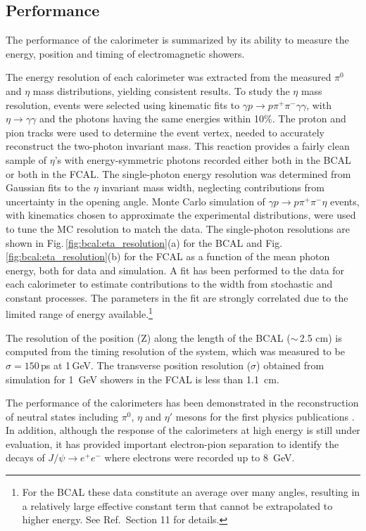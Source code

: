 \subsection{Performance \label{sec:calperformance}}
The performance of the calorimeter is summarized by its ability to measure the energy, position and timing of electromagnetic showers.

The energy resolution of each calorimeter was extracted from the measured $\pi^0$ and $\eta$ mass distributions, yielding consistent results. 
To study the $\eta$ mass resolution, events were selected using kinematic fits to $\gamma p \rightarrow p \pi^+ \pi^- \gamma \gamma$, with $\eta\rightarrow \gamma\gamma$ and the photons having the same energies within 10\%.
The proton and pion tracks were used to determine the event vertex, needed to accurately reconstruct the two-photon invariant mass.
This reaction provides a fairly clean sample of $\eta$'s with energy-symmetric photons recorded either both in the BCAL or both in the FCAL. 
The single-photon energy resolution was determined from Gaussian fits to the $\eta$ invariant mass width, neglecting contributions from uncertainty in the opening angle.
Monte Carlo simulation of $\gamma p \rightarrow p \pi^+ \pi^- \eta$ events, with kinematics chosen to approximate the experimental distributions, were used to tune the MC resolution to match the data. 
The single-photon resolutions are shown in Fig.\,\ref{fig:bcal:eta_resolution}(a) for the BCAL and Fig.\,\ref{fig:bcal:eta_resolution}(b) for the FCAL as a function of the mean photon energy, both for data and simulation.
A fit has been performed to the data for each calorimeter to estimate contributions to the width from stochastic and constant processes.  The parameters in the fit are strongly correlated due to the limited range of energy available.\footnote{For the BCAL these data constitute an average over many angles, resulting in a relatively large effective constant term that cannot be extrapolated to higher energy. 
See Ref.\,\cite{BEATTIE201824} Section 11 for details.}

The resolution of the position (Z) along the length of the BCAL ($\sim$\,2.5 cm) is computed from the timing resolution of the system, which was measured to be $\sigma=150$\,ps at 1\,GeV. The transverse position resolution ($\sigma$) obtained from simulation for 1~GeV showers in the FCAL is less than 1.1~cm.

The performance of the calorimeters has been demonstrated in the reconstruction of neutral states including $\pi^0$, $\eta$ and $\eta'$ mesons for the first \gx{} physics publications \cite{AlGhoul:2017nbp,Adhikari:2019gfa}. In addition, although the response of the calorimeters at high energy is still under evaluation, it has provided important electron-pion separation to identify the decays of $J/\psi\rightarrow e^+e^-$ \cite{Ali:2019lzf} where electrons were recorded up to 8~GeV. 

